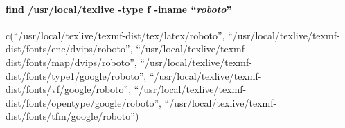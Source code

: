 \documentclass[
]{article}
\newenvironment{Shaded}{\begin{snugshade}}{\end{snugshade}}
\newcommand{\AttributeTok}[1]{\textcolor[rgb]{0.13,0.29,0.53}{#1}}
\newcommand{\ConstantTok}[1]{\textcolor[rgb]{0.56,0.35,0.01}{#1}}
\newcommand{\ControlFlowTok}[1]{\textcolor[rgb]{0.13,0.29,0.53}{\textbf{#1}}}
\newcommand{\DecValTok}[1]{\textcolor[rgb]{0.00,0.00,0.81}{#1}}
\newcommand{\FunctionTok}[1]{\textcolor[rgb]{0.13,0.29,0.53}{\textbf{#1}}}
\newcommand{\NormalTok}[1]{#1}
\newcommand{\SpecialCharTok}[1]{\textcolor[rgb]{0.81,0.36,0.00}{\textbf{#1}}}
\newcommand{\StringTok}[1]{\textcolor[rgb]{0.31,0.60,0.02}{#1}}
\begin{document}
\hypertarget{find-usrlocaltexlive--type-f--iname-roboto}{%
\paragraph{\texorpdfstring{find /usr/local/texlive -type f -iname
``\emph{roboto}''}{find /usr/local/texlive -type f -iname ``roboto''}}\label{find-usrlocaltexlive--type-f--iname-roboto}}

\begin{Shaded}
\end{Shaded}

c(``/usr/local/texlive/texmf-dist/tex/latex/roboto'',
``/usr/local/texlive/texmf-dist/fonts/enc/dvips/roboto'',
``/usr/local/texlive/texmf-dist/fonts/map/dvips/roboto'',
``/usr/local/texlive/texmf-dist/fonts/type1/google/roboto'',
``/usr/local/texlive/texmf-dist/fonts/vf/google/roboto'',
``/usr/local/texlive/texmf-dist/fonts/opentype/google/roboto'',
``/usr/local/texlive/texmf-dist/fonts/tfm/google/roboto'')
\end{document}

